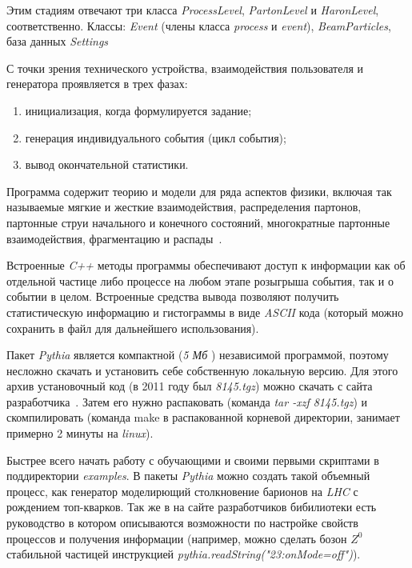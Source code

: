 Этим стадиям отвечают три класса \textit{ProcessLevel},
\textit{PartonLevel} и \textit{HaronLevel}, соответственно. Классы: \textit{Event}
(члены класса \textit{process} и \textit{event}), \textit{BeamParticles}, база данных
\textit{Settings}

С точки зрения технического устройства,
взаимодействия пользователя и генератора проявляется в
трех фазах:


\begin{enumerate}
	\item инициализация, когда формулируется задание;
	\item генерация индивидуального события (цикл события);
	\item вывод окончательной статистики.
\end{enumerate}

Программа содержит теорию и модели для ряда
аспектов физики, включая так называемые мягкие и жесткие
взаимодействия, распределения партонов, партонные струи
начального и конечного состояний, многократные
партонные взаимодействия, фрагментацию и распады~\cite{review-pythia}.

Встроенные \textit{C++} методы программы обеспечивают
доступ к информации как об отдельной частице либо
процессе на любом этапе розыгрыша события, так и о
событии в целом. Встроенные средства вывода позволяют
получить статистическую информацию и гистограммы в
виде \textit{ASCII} кода (который можно сохранить в файл для
дальнейшего использования).

Пакет \textit{Pythia} является компактной (\textit{5 Мб} )
независимой программой, поэтому несложно скачать и
установить себе собственную локальную версию. Для этого
архив установочный код (в 2011 году был \textit{8145.tgz}) можно
скачать с сайта разработчика~\cite{review-pythia}.
Затем его нужно распаковать (команда \textit{tar -xzf 8145.tgz})
и скомпилировать (команда make в распакованной корневой
директории, занимает примерно 2 минуты на \textit{linux}).

Быстрее всего начать работу с обучающими и своими
первыми скриптами в поддиректории \textit{examples}. В пакеты \textit{Pythia} можно создать такой объемный процесс, как генератор
моделирющий столкновение барионов на \textit{LHC} с рождением
топ-кварков. Так же в на сайте разработчиков бибилиотеки есть руководство в котором описываются возможности по настройке
свойств процессов и получения информации (например,
можно сделать бозон ${Z}^0$ стабильной частицей инструкцией \textit{pythia.readString("23:onMode=off")}). 

